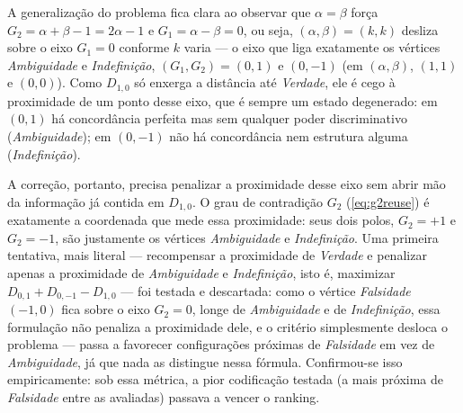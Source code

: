 				\par A generalização do problema fica clara ao observar que $\alpha=\beta$ força $G_2=\alpha+\beta-1=2\alpha-1$ e $G_1=\alpha-\beta=0$, ou seja, $(\alpha,\beta)=(k,k)$ desliza sobre o eixo $G_1=0$ conforme $k$ varia --- o eixo que liga exatamente os vértices \textit{Ambiguidade} e \textit{Indefinição}, $(G_1,G_2)=(0,1)$ e $(0,-1)$ (em $(\alpha,\beta)$, $(1,1)$ e $(0,0)$). Como $D_{1,0}$ só enxerga a distância até \textit{Verdade}, ele é cego à proximidade de um ponto desse eixo, que é sempre um estado degenerado: em $(0,1)$ há concordância perfeita mas sem qualquer poder discriminativo (\textit{Ambiguidade}); em $(0,-1)$ não há concordância nem estrutura alguma (\textit{Indefinição}).

				\par A correção, portanto, precisa penalizar a proximidade desse eixo sem abrir mão da informação já contida em $D_{1,0}$. O grau de contradição $G_2$ (\autoref{eq:g2reuse}) é exatamente a coordenada que mede essa proximidade: seus dois polos, $G_2=+1$ e $G_2=-1$, são justamente os vértices \textit{Ambiguidade} e \textit{Indefinição}. Uma primeira tentativa, mais literal --- recompensar a proximidade de \textit{Verdade} e penalizar apenas a proximidade de \textit{Ambiguidade} e \textit{Indefinição}, isto é, maximizar $D_{0,1}+D_{0,-1}-D_{1,0}$ --- foi testada e descartada: como o vértice \textit{Falsidade} $(-1,0)$ fica sobre o eixo $G_2=0$, longe de \textit{Ambiguidade} e de \textit{Indefinição}, essa formulação não penaliza a proximidade dele, e o critério simplesmente desloca o problema --- passa a favorecer configurações próximas de \textit{Falsidade} em vez de \textit{Ambiguidade}, já que nada as distingue nessa fórmula. Confirmou-se isso empiricamente: sob essa métrica, a pior codificação testada (a mais próxima de \textit{Falsidade} entre as avaliadas) passava a vencer o ranking.

